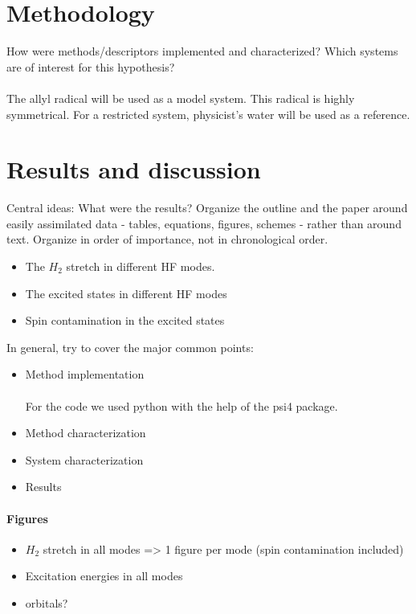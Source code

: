 \documentclass[twoside,twocolumn,9pt]{article}
\begin{document}
\section{Methodology}

How were methods/descriptors implemented and characterized? Which systems are of interest for this hypothesis?
\paragraph*{}
The allyl radical will be used as a model system. This radical is highly symmetrical. For a restricted system, physicist's water will be used as a reference.
\section{Results and discussion}

Central ideas: What were the results? Organize the outline and the paper around easily assimilated data - tables, equations, figures, schemes - rather than around text. Organize in order of importance, not in chronological order.

\begin{itemize}
    \item The $H_2$ stretch in different HF modes.
    \item The excited states in different HF modes
    \item Spin contamination in the excited states
\end{itemize}

In general, try to cover the major common points:
\begin{itemize}
    \item Method implementation
    \paragraph*{}
    For the code we used python with the help of the psi4 package.
    \item Method characterization
    \item System characterization
    \item Results
\end{itemize}
\paragraph*{Figures}
\begin{itemize}
    \item $H_2$ stretch in all modes => 1 figure per mode (spin contamination included)
    \item Excitation energies in all modes 
    \item orbitals?
\end{itemize}
\end{document}
